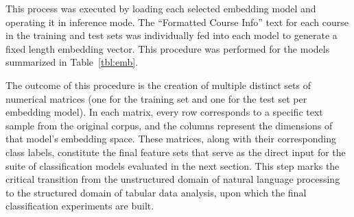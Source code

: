 This process was executed by loading each selected embedding model and operating it in inference mode. The ``Formatted Course Info'' text for each course in the training and test sets was individually fed into each model to generate a fixed length embedding vector. This procedure was performed for the models summarized in Table~\ref{tbl:emb}.
\begin{table}[!bt]
    \captionsetup{skip=5pt}
    \caption{Embedding Models \& PCA Explained Variance}
    \centering
    \label{tbl:emb}
\end{table}

The outcome of this procedure is the creation of multiple distinct sets of numerical matrices (one for the training set and one for the test set per embedding model). In each matrix, every row corresponds to a specific text sample from the original corpus, and the columns represent the dimensions of that model's embedding space. These matrices, along with their corresponding class labels, constitute the final feature sets that serve as the direct input for the suite of classification models evaluated in the next section. This step marks the critical transition from the unstructured domain of natural language processing to the structured domain of tabular data analysis, upon which the final classification experiments are built.

